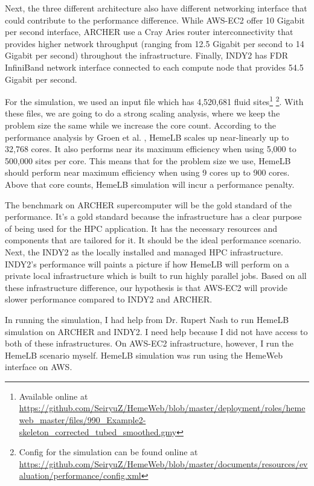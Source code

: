 Next, the three different architecture also have different networking interface that could contribute to the performance difference. While AWS-EC2 offer 10 Gigabit per second interface, ARCHER use a Cray Aries router interconnectivity that provides higher network throughput (ranging from 12.5 Gigabit per second to 14 Gigabit per second) throughout the infrastructure. Finally, INDY2 has FDR InfiniBand network interface connected to each compute node that provides 54.5 Gigabit per second. 


For the simulation, we used an input file which has 4,520,681 fluid sites\footnote{Available online at \url{https://github.com/SeiryuZ/HemeWeb/blob/master/deployment/roles/hemeweb_master/files/990_Example2-skeleton_corrected_tubed_smoothed.gmy}}  \footnote{Config for the simulation can be found online at \url{https://github.com/SeiryuZ/HemeWeb/blob/master/documents/resources/evaluation/performance/config.xml}}. With these files, we are going to do a strong scaling analysis, where we keep the problem size the same while we increase the core count. According to the performance analysis by Groen et al. \citep{groen2013analysing}, HemeLB scales up near-linearly up to 32,768 cores. It also performs near its maximum efficiency when using 5,000 to 500,000 sites per core. This means that for the problem size we use, HemeLB should perform near maximum efficiency when using 9 cores up to 900 cores. Above that core counts, HemeLB simulation will incur a performance penalty.


The benchmark on ARCHER supercomputer will be the gold standard of the performance. It's a gold standard because the infrastructure has a clear purpose of being used for the HPC application. It has the necessary resources and components that are tailored for it. It should be the ideal performance scenario. Next, the INDY2 as the locally installed and managed HPC infrastructure. INDY2's performance will paints a picture if how HemeLB will perform on a private local infrastructure which is built to run highly parallel jobs. Based on all these infrastructure difference, our hypothesis is that AWS-EC2 will provide slower performance compared to INDY2 and ARCHER.


In running the simulation, I had help from Dr. Rupert Nash to run HemeLB simulation on ARCHER and INDY2. I need help because I did not have access to both of these infrastructures. On AWS-EC2 infrastructure, however, I run the HemeLB scenario myself. HemeLB simulation was run using the HemeWeb interface on AWS.




